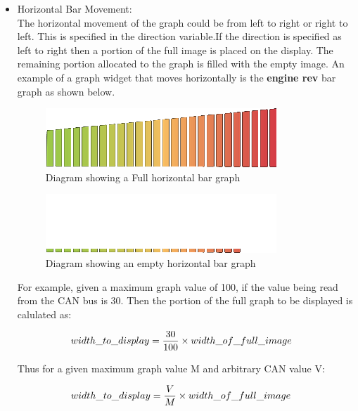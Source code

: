 \documentclass[11pt]{report} %
\begin{document}
	\begin{itemize}
	\item Horizontal Bar Movement: \\
	 The horizontal movement of the graph could be from left to right or right to left.
	 This is specified in the direction variable.If the direction is specified as left
	 to right then a portion of the full image is placed on the display. The remaining
	 portion allocated to the graph is filled with the empty image. An example of a graph
	 widget that moves horizontally is the {\bf engine rev} bar graph as shown below.
				
	\begin{figure}[H]
	\centering
	\includegraphics[scale=0.80]{images/rpm_graph_full.png}
	\caption{Diagram showing a Full horizontal bar graph}\label{fig:rpm_graph_full_diagram}
	\end{figure}
	
	\begin{figure}[H]
	\centering
	\includegraphics[scale=0.80]{images/rpm_graph_empty.png}
	\caption{Diagram showing an empty horizontal bar graph}\label{fig:rpm_graph_empty_diagram}
	\end{figure}
				
	For example, given a maximum graph value of 100, if the value being read from the CAN bus is 30. Then the portion of the
	full graph to be displayed is calulated as:
	
	\begin{center}			
	\begin{equation}
	\aligned
	width\_to\_display &= \frac{30}{100} \times width\_of\_full\_image
	\endaligned
	\end{equation}				
	
	Thus for a given maximum graph value M and arbitrary CAN value V:
	
	\begin{equation}
	\aligned
	width\_to\_display &= \frac{V}{M} \times width\_of\_full\_image
	\endaligned
	\end{equation}				
	\end{center}
				

\end{itemize}
\end{document}
